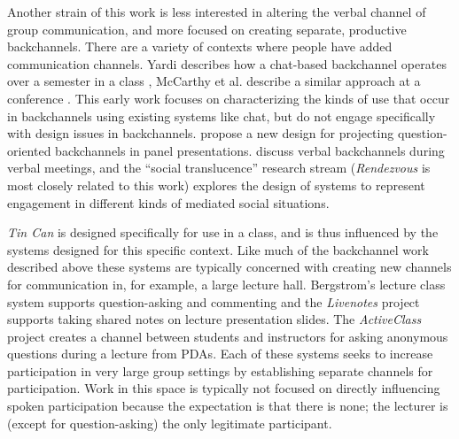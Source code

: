 Another strain of this work is less interested in altering the verbal channel of group communication, and more focused on creating separate, productive  backchannels. There are a variety of contexts where people have added communication channels. Yardi describes how a chat-based backchannel operates over a semester in a class \citep{Yardi:2006uk}, McCarthy et al. describe a similar approach at a conference \citep{mccarthy_digital_2004}. This early work focuses on characterizing the kinds of use that occur in backchannels using existing systems like chat, but do not engage specifically with design issues in backchannels. \citet{Harry:2009jh} propose a new design for projecting question-oriented backchannels in panel presentations.  \citet{Yankelovich:2005bx} discuss verbal backchannels during verbal meetings, and the ``social translucence'' research stream (\emph{Rendezvous} \citep{kellogg_leveraging_2006} is most closely related to this work) explores the design of systems to represent engagement in different kinds of mediated social situations.

\emph{Tin Can} is designed specifically for use in a class, and is thus influenced by the systems designed for this specific context. Like much of the backchannel work described above these systems are typically concerned with creating new channels for communication in, for example, a large lecture hall. Bergstrom's lecture class system \citep{Bergstrom:wl} supports question-asking and commenting and the \emph{Livenotes} project \citep{Kam:2005wb} supports taking shared notes on lecture presentation slides. The \emph{ActiveClass} project \citep{Ratto:2003vs} creates a channel between students and instructors for asking anonymous questions during a lecture from PDAs.  Each of these systems seeks to increase participation in very large group settings by establishing separate channels for participation.  Work in this space is typically not focused on directly influencing spoken participation because the expectation is that there is none; the lecturer is (except for question-asking) the only legitimate participant.

